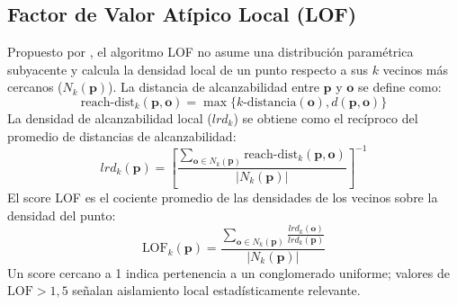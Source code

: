 \documentclass[11pt,a4paper]{article}
\begin{document}
\subsection{Factor de Valor Atípico Local (LOF)}
Propuesto por \citet{breunig2000lof}, el algoritmo LOF no asume una distribución paramétrica subyacente y calcula la densidad local de un punto respecto a sus $k$ vecinos más cercanos ($N_k(\mathbf{p})$). La distancia de alcanzabilidad entre $\mathbf{p}$ y $\mathbf{o}$ se define como:
\begin{equation}
    \text{reach-dist}_k(\mathbf{p}, \mathbf{o}) = \max \{ k\text{-distancia}(\mathbf{o}), d(\mathbf{p}, \mathbf{o}) \}
\end{equation}
La densidad de alcanzabilidad local ($lrd_k$) se obtiene como el recíproco del promedio de distancias de alcanzabilidad:
\begin{equation}
    lrd_k(\mathbf{p}) = \left[ \frac{\sum_{\mathbf{o} \in N_k(\mathbf{p})} \text{reach-dist}_k(\mathbf{p}, \mathbf{o})}{|N_k(\mathbf{p})|} \right]^{-1}
\end{equation}
El score LOF es el cociente promedio de las densidades de los vecinos sobre la densidad del punto:
\begin{equation}
    \text{LOF}_k(\mathbf{p}) = \frac{\sum_{\mathbf{o} \in N_k(\mathbf{p})} \frac{lrd_k(\mathbf{o})}{lrd_k(\mathbf{p})}}{|N_k(\mathbf{p})|}
\end{equation}
Un score cercano a 1 indica pertenencia a un conglomerado uniforme; valores de $\text{LOF} > 1,5$ señalan aislamiento local estadísticamente relevante.
\end{document}
